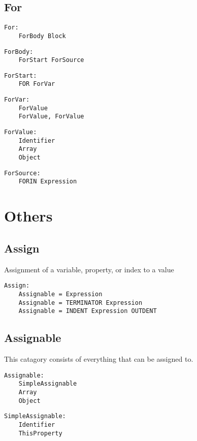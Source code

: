 \documentclass[10pt]{report}
\begin{document}
\subsection{For}
\begin{verbatim}
For:
    ForBody Block
\end{verbatim}

\begin{verbatim}
ForBody:
    ForStart ForSource
\end{verbatim}

\begin{verbatim}
ForStart:
    FOR ForVar
\end{verbatim}

\begin{verbatim}
ForVar:
    ForValue
    ForValue, ForValue
\end{verbatim}

\begin{verbatim}
ForValue:
    Identifier
    Array
    Object
\end{verbatim}

\begin{verbatim}
ForSource:
    FORIN Expression 
\end{verbatim}


\section{Others}

\subsection{Assign}
Assignment of a variable, property, or index to a value
\begin{verbatim}
Assign:
    Assignable = Expression
    Assignable = TERMINATOR Expression
    Assignable = INDENT Expression OUTDENT
\end{verbatim}


\subsection{Assignable}
This catagory consists of everything that can be assigned to.
\begin{verbatim}
Assignable:
    SimpleAssignable
    Array
    Object
\end{verbatim}

\begin{verbatim}
SimpleAssignable:
    Identifier
    ThisProperty
\end{verbatim}
\end{document}
